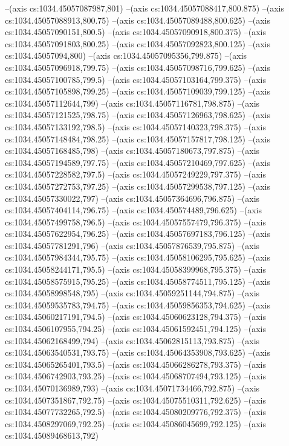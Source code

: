 --(axis cs:1034.45057087987,801)
--(axis cs:1034.45057088417,800.875)
--(axis cs:1034.45057088913,800.75)
--(axis cs:1034.45057089488,800.625)
--(axis cs:1034.45057090151,800.5)
--(axis cs:1034.45057090918,800.375)
--(axis cs:1034.45057091803,800.25)
--(axis cs:1034.45057092823,800.125)
--(axis cs:1034.45057094,800)
--(axis cs:1034.45057095356,799.875)
--(axis cs:1034.45057096918,799.75)
--(axis cs:1034.45057098716,799.625)
--(axis cs:1034.45057100785,799.5)
--(axis cs:1034.45057103164,799.375)
--(axis cs:1034.45057105898,799.25)
--(axis cs:1034.45057109039,799.125)
--(axis cs:1034.45057112644,799)
--(axis cs:1034.45057116781,798.875)
--(axis cs:1034.45057121525,798.75)
--(axis cs:1034.45057126963,798.625)
--(axis cs:1034.45057133192,798.5)
--(axis cs:1034.45057140323,798.375)
--(axis cs:1034.45057148484,798.25)
--(axis cs:1034.45057157817,798.125)
--(axis cs:1034.45057168485,798)
--(axis cs:1034.45057180673,797.875)
--(axis cs:1034.45057194589,797.75)
--(axis cs:1034.45057210469,797.625)
--(axis cs:1034.45057228582,797.5)
--(axis cs:1034.45057249229,797.375)
--(axis cs:1034.45057272753,797.25)
--(axis cs:1034.45057299538,797.125)
--(axis cs:1034.45057330022,797)
--(axis cs:1034.45057364696,796.875)
--(axis cs:1034.45057404114,796.75)
--(axis cs:1034.450574489,796.625)
--(axis cs:1034.45057499758,796.5)
--(axis cs:1034.45057557479,796.375)
--(axis cs:1034.45057622954,796.25)
--(axis cs:1034.45057697183,796.125)
--(axis cs:1034.45057781291,796)
--(axis cs:1034.45057876539,795.875)
--(axis cs:1034.45057984344,795.75)
--(axis cs:1034.45058106295,795.625)
--(axis cs:1034.45058244171,795.5)
--(axis cs:1034.45058399968,795.375)
--(axis cs:1034.45058575915,795.25)
--(axis cs:1034.45058774511,795.125)
--(axis cs:1034.45058998548,795)
--(axis cs:1034.45059251144,794.875)
--(axis cs:1034.45059535783,794.75)
--(axis cs:1034.45059856353,794.625)
--(axis cs:1034.45060217191,794.5)
--(axis cs:1034.45060623128,794.375)
--(axis cs:1034.4506107955,794.25)
--(axis cs:1034.45061592451,794.125)
--(axis cs:1034.45062168499,794)
--(axis cs:1034.45062815113,793.875)
--(axis cs:1034.45063540531,793.75)
--(axis cs:1034.45064353908,793.625)
--(axis cs:1034.45065265401,793.5)
--(axis cs:1034.45066286278,793.375)
--(axis cs:1034.4506742903,793.25)
--(axis cs:1034.45068707494,793.125)
--(axis cs:1034.45070136989,793)
--(axis cs:1034.45071734466,792.875)
--(axis cs:1034.4507351867,792.75)
--(axis cs:1034.45075510311,792.625)
--(axis cs:1034.45077732265,792.5)
--(axis cs:1034.45080209776,792.375)
--(axis cs:1034.4508297069,792.25)
--(axis cs:1034.45086045699,792.125)
--(axis cs:1034.45089468613,792)
